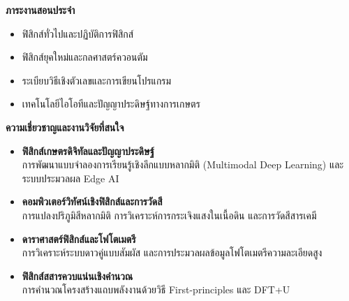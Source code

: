 \begin{tcolorbox}[
    enhanced,
    colback=white,
    colframe=rbruNavy!85!black,
    arc=3mm,
    boxrule=1pt,
    top=8pt, bottom=8pt, left=10pt, right=10pt,
    drop shadow=black!8
]
\begin{minipage}[t]{0.48\textwidth}
        \vspace{6pt}
        {\large\bfseries\color{rbruGreen} ภาระงานสอนประจำ}
        \vspace{3pt}
        \begin{itemize}[leftmargin=1.1em, itemsep=1.5pt, topsep=1pt]
            \item ฟิสิกส์ทั่วไปและปฏิบัติการฟิสิกส์
            \item ฟิสิกส์ยุคใหม่และกลศาสตร์ควอนตัม
            \item ระเบียบวิธีเชิงตัวเลขและการเขียนโปรแกรม
            \item เทคโนโลยีไอโอทีและปัญญาประดิษฐ์ทางการเกษตร
        \end{itemize}
    \end{minipage}
    \hfill
    \begin{minipage}[t]{0.48\textwidth}
        {\large\bfseries\color{rbruNavy} ความเชี่ยวชาญและงานวิจัยที่สนใจ}
        \vspace{3pt}
        \begin{itemize}[leftmargin=1.1em, itemsep=1.5pt, topsep=1pt]
            \item \textbf{ฟิสิกส์เกษตรดิจิทัลและปัญญาประดิษฐ์}\\
            การพัฒนาแบบจำลองการเรียนรู้เชิงลึกแบบหลากมิติ (Multimodal Deep Learning) และระบบประมวลผล Edge AI
            \item \textbf{คอมพิวเตอร์วิทัศน์เชิงฟิสิกส์และการวัดสี}\\
            การแปลงปริภูมิสีหลากมิติ การวิเคราะห์การกระเจิงแสงในเนื้อดิน และการวัดสีสารเคมี
            \item \textbf{ดาราศาสตร์ฟิสิกส์และโฟโตเมตรี}\\
            การวิเคราะห์ระบบดาวคู่แบบสัมผัส และการประมวลผลข้อมูลโฟโตเมตรีความละเอียดสูง
            \item \textbf{ฟิสิกส์สสารควบแน่นเชิงคำนวณ}\\
            การคำนวณโครงสร้างแถบพลังงานด้วยวิธี First-principles และ DFT+U
        \end{itemize}
    \end{minipage}
\end{tcolorbox}
\cleardoublepage

